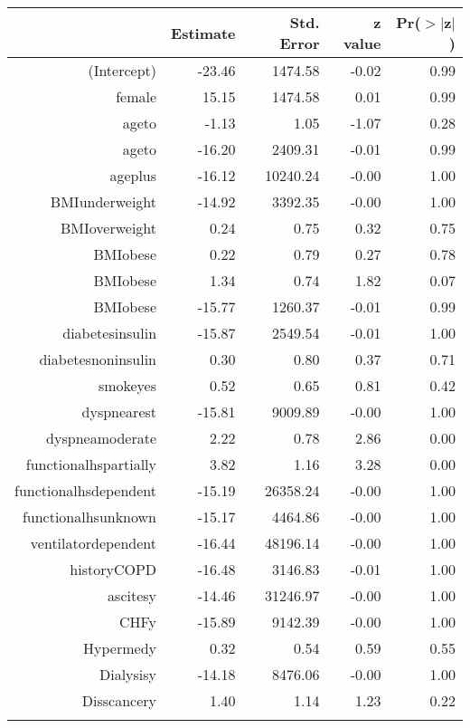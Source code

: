 \bigskip\bigskip
\centering
\begin{tabular}{rrrrr}
  \hline
 & Estimate & Std. Error & z value & Pr($>$$|$z$|$) \\ 
  \hline
(Intercept) & -23.46 & 1474.58 & -0.02 & 0.99 \\ 
  female & 15.15 & 1474.58 & 0.01 & 0.99 \\ 
  age\-65\-to\-74 & -1.13 & 1.05 & -1.07 & 0.28 \\ 
  age\-75\-to\-84 & -16.20 & 2409.31 & -0.01 & 0.99 \\ 
  age\-85\-plus & -16.12 & 10240.24 & -0.00 & 1.00 \\ 
  BMI\-underweight & -14.92 & 3392.35 & -0.00 & 1.00 \\ 
  BMI\-overweight & 0.24 & 0.75 & 0.32 & 0.75 \\ 
  BMI\-obese\-1 & 0.22 & 0.79 & 0.27 & 0.78 \\ 
  BMI\-obese\-2 & 1.34 & 0.74 & 1.82 & 0.07 \\ 
  BMI\-obese\-3 & -15.77 & 1260.37 & -0.01 & 0.99 \\ 
  diabetes\-insulin & -15.87 & 2549.54 & -0.01 & 1.00 \\ 
  diabetes\-noninsulin & 0.30 & 0.80 & 0.37 & 0.71 \\ 
  smoke\-yes & 0.52 & 0.65 & 0.81 & 0.42 \\ 
  dyspnea\-rest & -15.81 & 9009.89 & -0.00 & 1.00 \\ 
  dyspnea\-moderate & 2.22 & 0.78 & 2.86 & 0.00 \\ 
  functional\-hs\-partially & 3.82 & 1.16 & 3.28 & 0.00 \\ 
  functional\-hs\-dependent & -15.19 & 26358.24 & -0.00 & 1.00 \\ 
  functional\-hs\-unknown & -15.17 & 4464.86 & -0.00 & 1.00 \\ 
  ventilator\-dependent & -16.44 & 48196.14 & -0.00 & 1.00 \\ 
  history\-COPD & -16.48 & 3146.83 & -0.01 & 1.00 \\ 
  ascites\-y & -14.46 & 31246.97 & -0.00 & 1.00 \\ 
  CHF\-y & -15.89 & 9142.39 & -0.00 & 1.00 \\ 
  Hyper\-med\-y & 0.32 & 0.54 & 0.59 & 0.55 \\ 
  Dialysis\-y & -14.18 & 8476.06 & -0.00 & 1.00 \\ 
  Diss\-cancer\-y & 1.40 & 1.14 & 1.23 & 0.22 \\ 
$$
\end{tabular}
